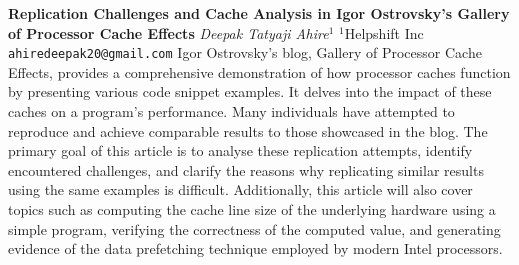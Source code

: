 
    \begin{conf-abstract}[]
        {\textbf{Replication Challenges and Cache Analysis in Igor Ostrovsky's Gallery of Processor Cache Effects}}
        {\textit{Deepak Tatyaji Ahire$^{1}$}}
        {$^{1}$Helpshift Inc}
        {\texttt{ahiredeepak20@gmail.com}}
        {Igor Ostrovsky's blog, Gallery of Processor Cache Effects, provides a comprehensive demonstration of how processor caches function by presenting various code snippet examples. It delves into the impact of these caches on a program's performance. Many individuals have attempted to reproduce and achieve comparable results to those showcased in the blog. The primary goal of this article is to analyse these replication attempts, identify encountered challenges, and clarify the reasons why replicating similar results using the same examples is difficult. Additionally, this article will also cover topics such as computing the cache line size of the underlying hardware using a simple program, verifying the correctness of the computed value, and generating evidence of the data prefetching technique employed by modern Intel processors.}
    \end{conf-abstract}
        
